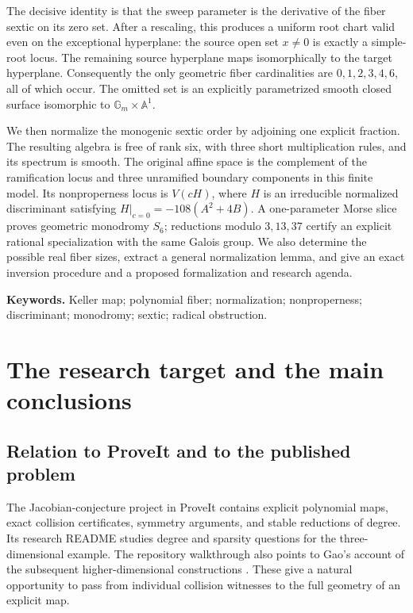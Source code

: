 \documentclass[11pt,a4paper]{article}
\theoremstyle{definition}
\newcommand{\A}{\mathbb A}
\newcommand{\Gm}{\mathbb G_m}
\begin{document}
The decisive identity is that the sweep parameter is the derivative of the
fiber sextic on its zero set. After a rescaling, this produces a uniform
root chart valid even on the exceptional hyperplane: the source open set
$x\ne0$ is exactly a simple-root locus. The remaining source hyperplane
maps isomorphically to the target hyperplane. Consequently the only
geometric fiber cardinalities are $0,1,2,3,4,6$, all of which occur. The
omitted set is an explicitly parametrized smooth closed surface isomorphic
to $\Gm\times\A^1$.

We then normalize the monogenic sextic order by adjoining one explicit
fraction. The resulting algebra is free of rank six, with three short
multiplication rules, and its spectrum is smooth. The original affine
space is the complement of the ramification locus and three unramified
boundary components in this finite model. Its nonproperness locus is
$V(cH)$, where $H$ is an irreducible normalized discriminant satisfying
$H|_{c=0}=-108(A^2+4B)$. A one-parameter Morse slice proves geometric
monodromy $S_6$; reductions modulo $3,13,37$ certify an explicit rational
specialization with the same Galois group. We also determine the possible
real fiber sizes, extract a general normalization lemma, and give an
exact inversion procedure and a proposed formalization and research agenda.

\medskip
\noindent\textbf{Keywords.} Keller map; polynomial fiber; normalization;
nonproperness; discriminant; monodromy; sextic; radical obstruction.

\newpage
\begingroup
\small
\setlength{\parskip}{0pt}
\tableofcontents
\endgroup
\newpage

\section{The research target and the main conclusions}
\label{sec:intro}

\subsection{Relation to ProveIt and to the published problem}
The Jacobian-conjecture project in ProveIt contains explicit polynomial
maps, exact collision certificates, symmetry arguments, and stable
reductions of degree. Its research README studies degree and sparsity
questions for the three-dimensional example. The repository walkthrough
also points to Gao's account of the subsequent higher-dimensional
constructions \cite{ProveIt,Gao}. These give a natural opportunity to pass
from individual collision witnesses to the full geometry of an explicit
map.
\end{document}
